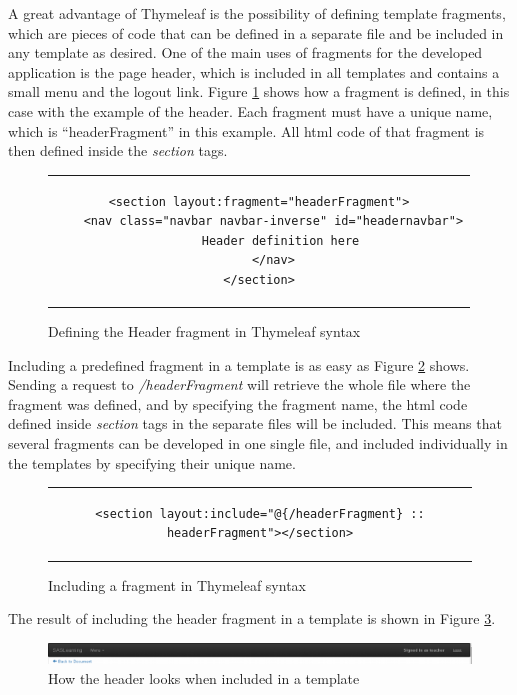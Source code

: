 A great advantage of Thymeleaf is the possibility of defining template fragments, which are pieces of code that can be defined in a separate file and be included in any template as desired. One of the main uses of fragments for the developed application is the page header, which is included in all templates and contains a small menu and the logout link. Figure \ref{figure:viewsHeaderFragment} shows how a fragment is defined, in this case with the example of the header. Each fragment must have a unique name, which is ``headerFragment'' in this example. All html code of that fragment is then defined inside the \textit{section} tags.
\begin{figure}[h]
\centering
\lstset{style=customhtml}
\begin{tabular}{c}
\begin{lstlisting}
<section layout:fragment="headerFragment">
	<nav class="navbar navbar-inverse" id="headernavbar">
		Header definition here	
	</nav>
</section>
\end{lstlisting}
\end{tabular}
\caption{Defining the Header fragment in Thymeleaf syntax}
\label{figure:viewsHeaderFragment}
\end{figure}

Including a predefined fragment in a template is as easy as Figure \ref{figure:viewsIncludeFragment} shows. Sending a request to \textit{/headerFragment} will retrieve the whole file where the fragment was defined, and by specifying the fragment name, the html code defined inside \textit{section} tags in the separate files will be included. This means that several fragments can be developed in one single file, and included individually in the templates by specifying their unique name.
\begin{figure}[h]
\centering
\lstset{style=customhtml}
\begin{tabular}{c}
\begin{lstlisting}
<section layout:include="@{/headerFragment} :: headerFragment"></section>
\end{lstlisting}
\end{tabular}
\caption{Including a fragment in Thymeleaf syntax}
\label{figure:viewsIncludeFragment}
\end{figure}

The result of including the header fragment in a template is shown in Figure \ref{figure:viewsHeaderLooks}.

\begin{figure}[h]
\centering
\includegraphics[scale=0.4]{images/header}
\caption{How the header looks when included in a template}
\label{figure:viewsHeaderLooks}
\end{figure}

